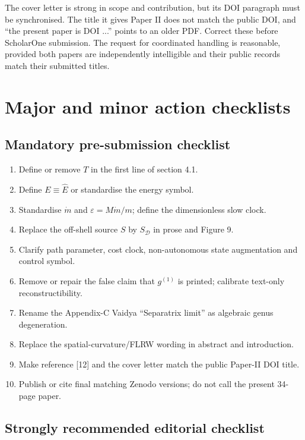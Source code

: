 \documentclass[11pt,a4paper]{article}
\newcommand{\Ehat}{\hat E}
\newcommand{\SD}{S_{\mathcal D}}
\begin{document}
The cover letter is strong in scope and contribution, but its DOI paragraph must be synchronised.
The title it gives Paper II does not match the public DOI, and ``the present paper is DOI ...''
points to an older PDF. Correct these before ScholarOne submission. The request for coordinated
handling is reasonable, provided both papers are independently intelligible and their public
records match their submitted titles.

\clearpage
\section{Major and minor action checklists}

\subsection{Mandatory pre-submission checklist}

\begin{enumerate}[label=\textbf{M\arabic*.}]
  \item Define or remove $T$ in the first line of section 4.1.
  \item Define $E\equiv\Ehat$ or standardise the energy symbol.
  \item Standardise $\dot m$ and $\varepsilon=M\dot m/m$; define the dimensionless slow clock.
  \item Replace the off-shell source $S$ by $\SD$ in prose and Figure 9.
  \item Clarify path parameter, cost clock, non-autonomous state augmentation and control symbol.
  \item Remove or repair the false claim that $g^{(1)}$ is printed; calibrate text-only
  reconstructibility.
  \item Rename the Appendix-C Vaidya ``Separatrix limit'' as algebraic genus degeneration.
  \item Replace the spatial-curvature/FLRW wording in abstract and introduction.
  \item Make reference [12] and the cover letter match the public Paper-II DOI title.
  \item Publish or cite final matching Zenodo versions; do not call  the
  present 34-page paper.
\end{enumerate}

\subsection{Strongly recommended editorial checklist}
\end{document}
